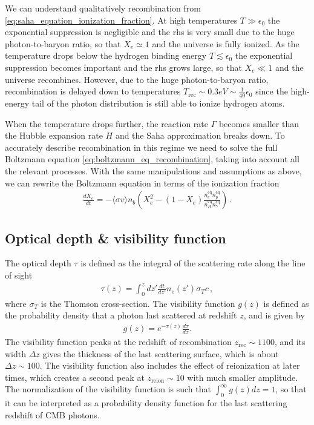 We can understand qualitatively recombination from \eqref{eq:saha_equation_ionization_fraction}.
At high temperatures $T \gg \epsilon_0$ the exponential suppression is negligible and the rhs is very small due to the huge photon-to-baryon ratio, so that $X_e \simeq 1$ and the universe is fully ionized.
As the temperature drops below the hydrogen binding energy $T \lesssim \epsilon_0$ the exponential suppression becomes important and the rhs grows large, so that $X_e \ll 1$ and the universe recombines.
However, due to the huge photon-to-baryon ratio, recombination is delayed down to temperatures $T_{\text{rec}} \sim 0.3 eV  \sim \tfrac{1}{40}\epsilon_0$ since the high-energy tail of the photon distribution is still able to ionize hydrogen atoms.

When the temperature drops further, the reaction rate $\Gamma$ becomes smaller than the Hubble expansion rate $H$ and the Saha approximation breaks down.
To accurately describe recombination in this regime we need to solve the full Boltzmann equation \eqref{eq:boltzmann_eq_recombination}, taking into account all the relevant processes.
With the same manipulations and assumptions as above, we can rewrite the Boltzmann equation in terms of the ionization fraction
\begin{align}\label{eq:boltzmann_eq_ionization_fraction}
    \frac{dX_e}{dt} = - \langle \sigma v \rangle n_b \left( X_e^2 - (1 - X_e) \frac{n_e^{\text{eq}} n_p^{\text{eq}}}{n_H^{\text{eq}} n_\gamma^{\text{eq}}} \right)\,.
\end{align}


\subsection{Optical depth \& visibility function}
%
The optical depth $\tau$ is defined as the integral of the scattering rate along the line of sight
\begin{align}
    \tau(z) = \int_0^z dz' \frac{dt}{dz'} n_e(z') \sigma_T c\,,
\end{align}
where $\sigma_T$ is the Thomson cross-section.
The visibility function $g(z)$ is defined as the probability density that a photon last scattered at redshift $z$, and is given by
\begin{align}
    g(z) = e^{-\tau(z)} \frac{d\tau}{dz}.
\end{align}
The visibility function peaks at the redshift of recombination $z_{\text{rec}} \sim 1100$, and its width $\Delta z$ gives the thickness of the last scattering surface, which is about $\Delta z \sim 100$.
The visibility function also includes the effect of reionization at later times, which creates a second peak at $z_{\text{reion}} \sim 10$ with much smaller amplitude.
The normalization of the visibility function is such that $\int_0^\infty g(z) dz = 1$, so that it can be interpreted as a probability density function for the last scattering redshift of CMB photons.